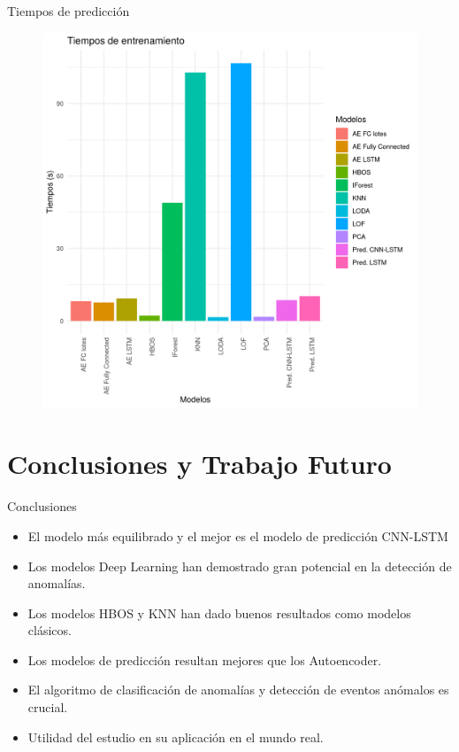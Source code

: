 \documentclass[10pt]{beamer}
\begin{document}
\begin{frame}[fragile]{Tiempos de predicción}
	\vspace{10px}
	\pause
	
	\begin{figure}[H]
		\centering
		\includegraphics[scale=0.43]{Imagenes/tiempos_prediccion2.png}
	\end{figure}
	
\end{frame}

\section{Conclusiones y Trabajo Futuro}

\begin{frame}[fragile]{Conclusiones}
	\vspace{10px}
	\pause
	
	\begin{itemize}
		\item El modelo más equilibrado y el mejor es el modelo de predicción CNN-LSTM
		\pause
		\item Los modelos Deep Learning han demostrado gran potencial en la detección de anomalías.
		\pause
		\item Los modelos HBOS y KNN han dado buenos resultados como modelos clásicos.
		\pause
		\item Los modelos de predicción resultan mejores que los Autoencoder.
		\pause
		\item El algoritmo de clasificación de anomalías y detección de eventos anómalos es crucial.
		\pause
		\item Utilidad del estudio en su aplicación en el mundo real.
	\end{itemize}
	
\end{frame}
\end{document}
